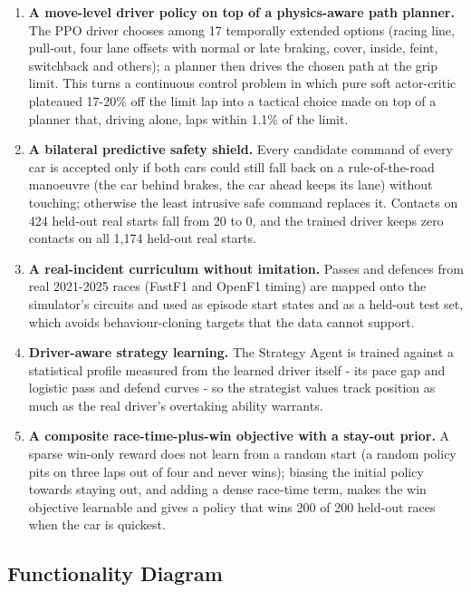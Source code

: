 \documentclass{ieeeaccess}
\providecommand{\tightlist}{\setlength{\itemsep}{0pt}\setlength{\parskip}{0pt}}
\begin{document}
\begin{enumerate}
\def\labelenumi{\arabic{enumi}.}
\tightlist
\item
  \textbf{A move-level driver policy on top of a physics-aware path planner.} The PPO
  driver chooses among 17 temporally extended options (racing line, pull-out,
  four lane offsets with normal or late braking, cover, inside, feint, switchback
  and others); a planner then drives the chosen path at the grip limit. This turns
  a continuous control problem in which pure soft actor-critic plateaued 17-20\%
  off the limit lap into a tactical choice made on top of a planner that, driving
  alone, laps within 1.1\% of the limit.
\item
  \textbf{A bilateral predictive safety shield.} Every candidate command of every car
  is accepted only if both cars could still fall back on a rule-of-the-road
  manoeuvre (the car behind brakes, the car ahead keeps its lane) without
  touching; otherwise the least intrusive safe command replaces it. Contacts on
  424 held-out real starts fall from 20 to 0, and the trained driver keeps zero
  contacts on all 1,174 held-out real starts.
\item
  \textbf{A real-incident curriculum without imitation.} Passes and defences from real
  2021-2025 races (FastF1 and OpenF1 timing) are mapped onto the simulator's
  circuits and used as episode start states and as a held-out test set, which
  avoids behaviour-cloning targets that the data cannot support.
\item
  \textbf{Driver-aware strategy learning.} The Strategy Agent is trained against a
  statistical profile measured from the learned driver itself - its pace gap and
  logistic pass and defend curves - so the strategist values track position as
  much as the real driver's overtaking ability warrants.
\item
  \textbf{A composite race-time-plus-win objective with a stay-out prior.} A sparse
  win-only reward does not learn from a random start (a random policy pits on
  three laps out of four and never wins); biasing the initial policy towards
  staying out, and adding a dense race-time term, makes the win objective
  learnable and gives a policy that wins 200 of 200 held-out races when the car
  is quickest.
\end{enumerate}

\subsection{Functionality Diagram}
\end{document}
